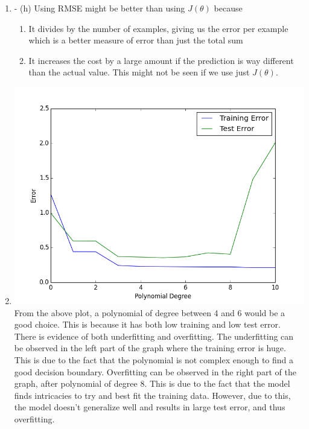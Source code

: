 \documentclass[11pt]{article}
\newcommand{\solution}[1]{{{\color{blue}{\bf Solution:} {#1}}}}
\begin{document}
\begin{enumerate}
\item - (h)
\solution{} \newline
Using RMSE might be better than using $J(\theta)$ because 
\begin{enumerate}
	\item It divides by the number of examples, giving us the error per example
		  which is a better measure of error than just the total sum
	\item It increases the cost by a large amount if the prediction is way different
		  than the actual value. This might not be seen if we use just $J(\theta)$.
\end{enumerate}

\addtocounter{enumi}{1}

\item 
\solution{} \newline
\includegraphics[scale=0.6]{5i.png} \newline
From the above plot, a polynomial of degree between 4 and 6 would be a good choice.
This is because it has both low training and low test error. \newline
There is evidence of both underfitting and overfitting. \newline
The underfitting can be observed in the left part of the graph where the training error 
is huge. This is due to the fact that the polynomial is not complex enough to find a 
good decision boundary. \newline
Overfitting can be observed in the right part of the graph, after polynomial of degree 8.
This is due to the fact that the model finds intricacies to try and best fit the training
data. However, due to this, the model doesn't generalize well and results in large test
error, and thus overfitting.
\end{enumerate}
\end{document}
